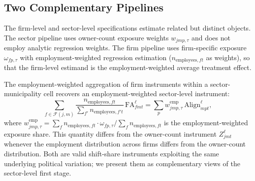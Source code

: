 \documentclass{article}
\newcommand{\Align}{\mathrm{Align}}
\newcommand{\FA}{\mathrm{FA}}
\begin{document}
\subsection{Two Complementary Pipelines}

The firm-level and sector-level specifications estimate related but distinct objects.
The sector pipeline uses owner-count exposure weights $w_{jmp,\tau}$
and does not employ analytic regression weights.
The firm pipeline uses firm-specific exposure $\omega_{fp,\tau}$
with employment-weighted regression estimation ($n_{\text{employees},ft}$ as weights),
so that the firm-level estimand is the employment-weighted average treatment effect.

The employment-weighted aggregation of firm instruments within a sector-municipality cell
recovers an employment-weighted sector-level instrument:
\[
  \sum_{f\in\mathcal{F}(j,m)}
    \frac{n_{\text{employees},ft}}{\sum_{f'} n_{\text{employees},f't}}\,
    \FA^{\ell}_{fmt}
  = \sum_p w^{\text{emp}}_{jmp,\tau}\,\Align^{\ell}_{mpt},
\]
where $w^{\text{emp}}_{jmp,\tau}
= \sum_f n_{\text{employees},ft} \cdot \omega_{fp,\tau}
  / \sum_f n_{\text{employees},ft}$
is the employment-weighted exposure share.
This quantity differs from the owner-count instrument $Z^{\ell}_{jmt}$
whenever the employment distribution across firms differs from the owner-count distribution.
Both are valid shift-share instruments exploiting the same underlying political variation;
we present them as complementary views of the sector-level first stage.
\end{document}
